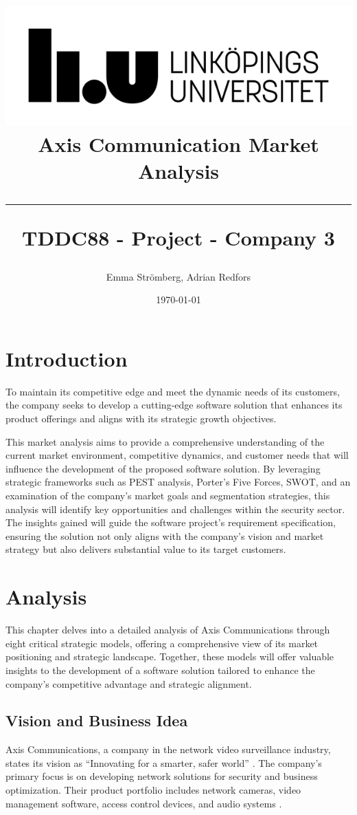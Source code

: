 \documentclass{article}
\title{
\includegraphics[scale=1.5]{liu_logga.png} \\
\vspace{2.0cm} \textbf{Axis Communication Market Analysis} \\
 \endgraf\rule{\textwidth}{.4pt}
  \large \textbf{TDDC88 - Project - Company 3}\\
   }
\author{Emma Strömberg, Adrian Redfors}
\date{\today}
\begin{document}
\maketitle


\newpage
\tableofcontents
\newpage

\section{Introduction}
 To maintain its competitive edge and meet the dynamic needs of its customers, the company seeks to develop a cutting-edge software solution that enhances its product offerings and aligns with its strategic growth objectives.

This market analysis aims to provide a comprehensive understanding of the current market environment, competitive dynamics, and customer needs that will influence the development of the proposed software solution. By leveraging strategic frameworks such as PEST analysis, Porter’s Five Forces, SWOT, and an examination of the company’s market goals and segmentation strategies, this analysis will identify key opportunities and challenges within the security sector. The insights gained will guide the software project’s requirement specification, ensuring the solution not only aligns with the company’s vision and market strategy but also delivers substantial value to its target customers.


\newpage
\section{Analysis}
This chapter delves into a detailed analysis of Axis Communications through eight critical strategic models, offering a comprehensive view of its market positioning and strategic landscape. Together, these models will offer valuable insights to the development of a software solution tailored to enhance the company's competitive advantage and strategic alignment.



\subsection{Vision and Business Idea}

Axis Communications, a company in the network video surveillance industry, states its vision as \enquote{Innovating for a smarter, safer world} \cite{axis_about}. The company's primary focus is on developing network solutions for security and business optimization. Their product portfolio includes network cameras, video management software, access control devices, and audio systems \cite{axis_about, axis_homepage}. 
\end{document}
